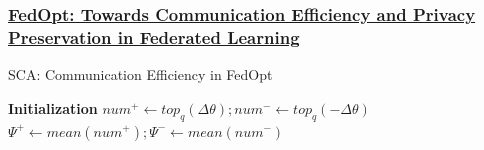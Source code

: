 \documentclass[10pt]{beamer}
\begin{document}
    \begin{frame}
        \frametitle{
            \href{https://www.mdpi.com/2076-3417/10/8/2864}{
            FedOpt: Towards Communication Efficiency and Privacy Preservation in Federated Learning
            }
        }

        \begin{algorithm}[H]
      
                        
            \caption{SCA: Communication Efficiency in FedOpt}
            \label{alg1}
            \textbf{Initialization}\;
            $ num^+ \leftarrow top_{q}(\Delta \theta); num^- \leftarrow top_{q}(- \Delta \theta) $ \\
            $ \Psi^+ \leftarrow mean(num^+); \Psi^- \leftarrow mean(num^-) $ \\
        \end{algorithm}
    
    \end{frame}
\end{document}
